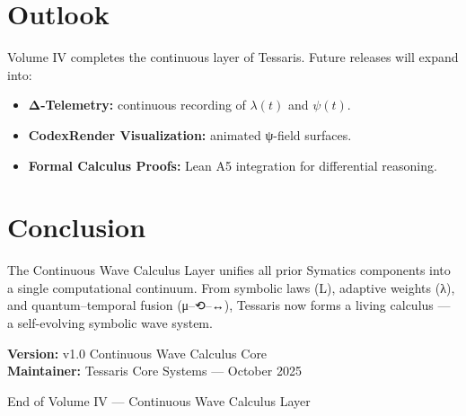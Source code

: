 \documentclass[11pt]{article}
\begin{document}
\section{Outlook}
Volume IV completes the continuous layer of Tessaris.
Future releases will expand into:
\begin{itemize}
  \item \textbf{Δ-Telemetry:} continuous recording of $\lambda(t)$ and $\psi(t)$.
  \item \textbf{CodexRender Visualization:} animated ψ-field surfaces.
  \item \textbf{Formal Calculus Proofs:} Lean A5 integration for differential reasoning.
\end{itemize}

\section*{Conclusion}
The Continuous Wave Calculus Layer unifies all prior Symatics components into a single computational continuum.
From symbolic laws (L), adaptive weights (λ), and quantum–temporal fusion (μ–⟲–↔), Tessaris now forms a living calculus — a self-evolving symbolic wave system.

\bigskip
\noindent
\textcolor{tessarisgray}{\textbf{Version:}} v1.0 Continuous Wave Calculus Core\\
\textcolor{tessarisgray}{\textbf{Maintainer:}} Tessaris Core Systems — October 2025

\vfill
\begin{center}
{\small \textcolor{tessarisgray}{End of Volume IV — Continuous Wave Calculus Layer}}
\end{center}
\end{document}
